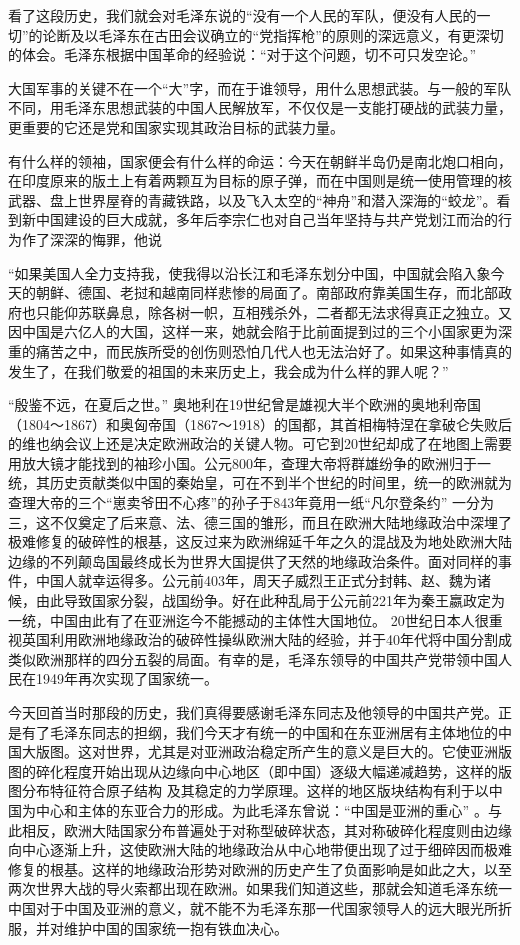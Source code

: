 \documentclass[UTF8, 12pt, a4paper]{ctexrep}
\begin{document}
看了这段历史，我们就会对毛泽东说的“没有一个人民的军队，便没有人民的一切”的论断及以毛泽东在古田会议确立的“党指挥枪”的原则的深远意义，有更深切的体会。毛泽东根据中国革命的经验说：“对于这个问题，切不可只发空论。”

大国军事的关键不在一个“大”字，而在于谁领导，用什么思想武装。与一般的军队不同，用毛泽东思想武装的中国人民解放军，不仅仅是一支能打硬战的武装力量，更重要的它还是党和国家实现其政治目标的武装力量。

有什么样的领袖，国家便会有什么样的命运：今天在朝鲜半岛仍是南北炮口相向，在印度原来的版土上有着两颗互为目标的原子弹，而在中国则是统一使用管理的核武器、盘上世界屋脊的青藏铁路，以及飞入太空的“神舟”和潜入深海的“蛟龙”。看到新中国建设的巨大成就，多年后李宗仁也对自己当年坚持与共产党划江而治的行为作了深深的悔罪，他说

“如果美国人全力支持我，使我得以沿长江和毛泽东划分中国，中国就会陷入象今天的朝鲜、德国、老挝和越南同样悲惨的局面了。南部政府靠美国生存，而北部政府也只能仰苏联鼻息，除各树一帜，互相残杀外，二者都无法求得真正之独立。又因中国是六亿人的大国，这样一来，她就会陷于比前面提到过的三个小国家更为深重的痛苦之中，而民族所受的创伤则恐怕几代人也无法治好了。如果这种事情真的发生了，在我们敬爱的祖国的未来历史上，我会成为什么样的罪人呢？”

“殷鉴不远，在夏后之世。” 奥地利在19世纪曾是雄视大半个欧洲的奥地利帝国（1804～1867）和奥匈帝国（1867～1918）的国都，其首相梅特涅在拿破仑失败后的维也纳会议上还是决定欧洲政治的关键人物。可它到20世纪却成了在地图上需要用放大镜才能找到的袖珍小国。公元800年，查理大帝将群雄纷争的欧洲归于一统，其历史贡献类似中国的秦始皇，可在不到半个世纪的时间里，统一的欧洲就为查理大帝的三个“崽卖爷田不心疼”的孙子于843年竟用一纸“凡尔登条约” 一分为三，这不仅奠定了后来意、法、德三国的雏形，而且在欧洲大陆地缘政治中深埋了极难修复的破碎性的根基，这反过来为欧洲绵延千年之久的混战及为地处欧洲大陆边缘的不列颠岛国最终成长为世界大国提供了天然的地缘政治条件。面对同样的事件，中国人就幸运得多。公元前403年，周天子威烈王正式分封韩、赵、魏为诸候，由此导致国家分裂，战国纷争。好在此种乱局于公元前221年为秦王嬴政定为一统，中国由此有了在亚洲迄今不能撼动的主体性大国地位。 20世纪日本人很重视英国利用欧洲地缘政治的破碎性操纵欧洲大陆的经验，并于40年代将中国分割成类似欧洲那样的四分五裂的局面。有幸的是，毛泽东领导的中国共产党带领中国人民在1949年再次实现了国家统一。

今天回首当时那段的历史，我们真得要感谢毛泽东同志及他领导的中国共产党。正是有了毛泽东同志的担纲，我们今天才有统一的中国和在东亚洲居有主体地位的中国大版图。这对世界，尤其是对亚洲政治稳定所产生的意义是巨大的。它使亚洲版图的碎化程度开始出现从边缘向中心地区（即中国）逐级大幅递减趋势，这样的版图分布特征符合原子结构 及其稳定的力学原理。这样的地区版块结构有利于以中国为中心和主体的东亚合力的形成。为此毛泽东曾说：“中国是亚洲的重心” 。与此相反，欧洲大陆国家分布普遍处于对称型破碎状态，其对称破碎化程度则由边缘向中心逐渐上升，这使欧洲大陆的地缘政治从中心地带便出现了过于细碎因而极难修复的根基。这样的地缘政治形势对欧洲的历史产生了负面影响是如此之大，以至两次世界大战的导火索都出现在欧洲。如果我们知道这些，那就会知道毛泽东统一中国对于中国及亚洲的意义，就不能不为毛泽东那一代国家领导人的远大眼光所折服，并对维护中国的国家统一抱有铁血决心。
\end{document}
